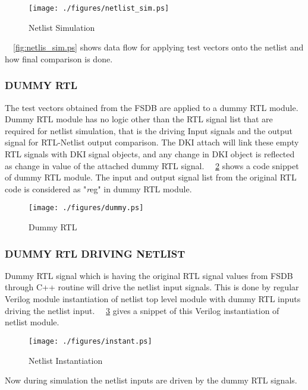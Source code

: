\begin{figure}[h]
\centering
\texttt{[image: ./figures/netlist\_sim.ps]}
\caption{Netlist Simulation}
\label{fig:netlist_sim.ps}
\end{figure}

~\figurename{~\ref{fig:netlis_sim.ps}} shows data flow for applying test vectors onto the netlist and how final comparison is done.

\subsubsection{DUMMY RTL}
The test vectors obtained from the FSDB are applied to a dummy RTL module. Dummy RTL module has no logic other than the RTL signal list that are required for netlist simulation, that is the driving Input signals and the output signal for RTL-Netlist output comparison. The DKI attach will link these empty RTL signals with DKI signal objects, and any change in DKI object is reflected as change in value of the attached dummy RTL signal. ~\figurename{~\ref{fig:dummy.ps}} shows a code snippet of dummy RTL module. The input and output signal list from the original RTL code is considered as "{\emph reg}" in dummy RTL module.


\begin{figure}[h]
\centering
\texttt{[image: ./figures/dummy.ps]}
\caption{Dummy RTL}
\label{fig:dummy.ps}
\end{figure}

\subsubsection{DUMMY RTL DRIVING NETLIST}

Dummy RTL signal which is having the original RTL signal values from FSDB through C++ routine will drive the netlist input signals. This is done by regular Verilog module instantiation of netlist top level module with dummy RTL inputs driving the netlist input. ~\figurename{~\ref{fig:instant.ps}} gives a snippet of this Verilog instantiation of netlist module.

\begin{figure}[h]
\centering
\texttt{[image: ./figures/instant.ps]}
\caption{Netlist Instantiation}
\label{fig:instant.ps}
\end{figure}

Now during simulation the netlist inputs are driven by the dummy RTL signals.

